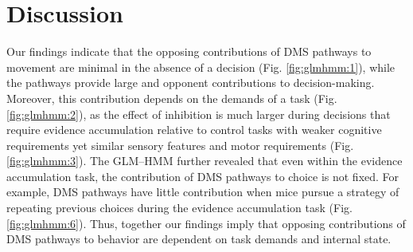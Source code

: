 \section{Discussion}
\label{sec:glmhmm:discussion}

Our findings indicate that the opposing contributions of DMS pathways to movement are minimal in the absence of a decision (Fig. \ref{fig:glmhmm:1}), while the pathways provide large and opponent contributions to decision-making. Moreover, this contribution depends on the demands of a task (Fig. \ref{fig:glmhmm:2}), as the effect of inhibition is much larger during decisions that require evidence accumulation relative to control tasks with weaker cognitive requirements yet similar sensory features and motor requirements (Fig. \ref{fig:glmhmm:3}). The GLM–HMM further revealed that even within the evidence accumulation task, the contribution of DMS pathways to choice is not fixed. For example, DMS pathways have little contribution when mice pursue a strategy of repeating previous choices during the evidence accumulation task (Fig. \ref{fig:glmhmm:6}). Thus, together our findings imply that opposing contributions of DMS pathways to behavior are dependent on task demands and internal state.


